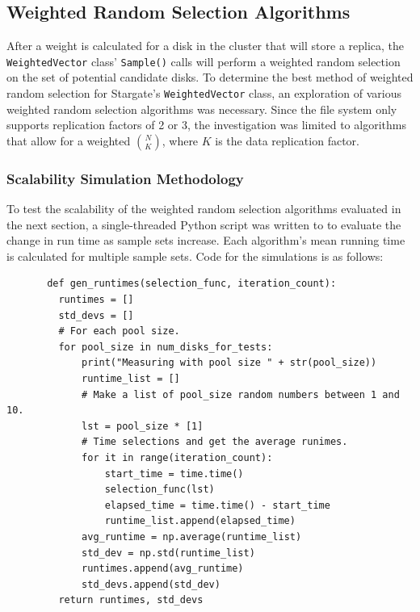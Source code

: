 \documentclass[12pt]{article}
\begin{document}
  \subsection{Weighted Random Selection Algorithms}

  After a weight is calculated for a disk in the cluster that will store a
  replica, the \texttt{WeightedVector} class' \texttt{Sample()} calls will
  perform a weighted random selection on the set of potential candidate disks.
  To determine the best method of weighted random selection for Stargate's
  \texttt{WeightedVector} class, an exploration of various weighted random
  selection algorithms was necessary.  Since the file system only supports
  replication factors of 2 or 3, the investigation was limited to algorithms
  that allow for a weighted $\binom{N}{K}$, where $K$ is the data replication
  factor.

    \subsubsection{Scalability Simulation Methodology}
     To test the scalability of the weighted random selection algorithms
     evaluated in the next section, a single-threaded Python \cite{python}
     script was written to to evaluate the change in run time as sample sets
     increase. Each algorithm's mean running time is calculated for multiple
     sample sets. Code for the simulations is as follows:

     \singlespace
     \begin{tcolorbox}
     \begin{verbatim}
       def gen_runtimes(selection_func, iteration_count):
         runtimes = []
         std_devs = []
         # For each pool size.
         for pool_size in num_disks_for_tests:
             print("Measuring with pool size " + str(pool_size))
             runtime_list = []
             # Make a list of pool_size random numbers between 1 and 10.
             lst = pool_size * [1]
             # Time selections and get the average runimes.
             for it in range(iteration_count):
                 start_time = time.time()
                 selection_func(lst)
                 elapsed_time = time.time() - start_time
                 runtime_list.append(elapsed_time)
             avg_runtime = np.average(runtime_list)
             std_dev = np.std(runtime_list)
             runtimes.append(avg_runtime)
             std_devs.append(std_dev)
         return runtimes, std_devs
     \end{verbatim}
     \end{tcolorbox}
     \doublespace
        
\end{document}

